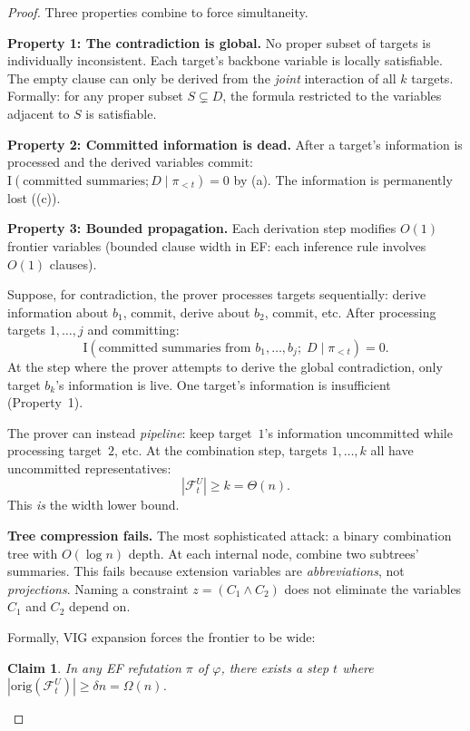 \documentclass[11pt]{article}
\newtheorem{claim}[theorem]{Claim}
\theoremstyle{definition}
\newcommand{\MI}{\mathrm{I}}
\newcommand{\frontier}{\mathcal{F}}
\begin{document}
\begin{proof}
Three properties combine to force simultaneity.

\textbf{Property 1: The contradiction is global.}  No
proper subset of targets is individually inconsistent.  Each target's
backbone variable is locally satisfiable.  The empty clause can only
be derived from the \emph{joint} interaction of all $k$ targets.
Formally: for any proper subset $S \subsetneq D$,
the formula restricted to the variables adjacent to $S$
is satisfiable.

\textbf{Property 2: Committed information is dead.}  After a target's
information is processed and the derived variables commit:
$\MI(\text{committed summaries}; D \mid \pi_{<t}) = 0$ by
(a).  The information is permanently lost
((c)).

\textbf{Property 3: Bounded propagation.}  Each derivation step modifies
$O(1)$ frontier variables (bounded clause width in EF: each inference
rule involves $O(1)$ clauses).

\medskip

Suppose, for contradiction, the prover processes targets sequentially:
derive information about $b_1$, commit, derive about $b_2$, commit,
etc.  After processing targets $1, \ldots, j$ and committing:
\[
\MI(\text{committed summaries from } b_1, \ldots, b_j;\;
D \mid \pi_{<t}) = 0.
\]
At the step where the prover attempts to derive the global
contradiction, only target $b_k$'s information is live.  One target's
information is insufficient (Property~1).

The prover can instead \emph{pipeline}: keep target~$1$'s information
uncommitted while processing target~$2$, etc.  At the combination step,
targets $1, \ldots, k$ all have uncommitted representatives:
\[
|\frontier_t^U| \geq k = \Theta(n).
\]
This \emph{is} the width lower bound.

\textbf{Tree compression fails.}  The most sophisticated attack: a
binary combination tree with $O(\log n)$ depth.  At each internal node,
combine two subtrees' summaries.  This fails because extension variables
are \emph{abbreviations}, not \emph{projections}.  Naming a constraint
$z = (C_1 \wedge C_2)$ does not eliminate the variables $C_1$ and $C_2$
depend on.

Formally, VIG expansion forces the frontier to be wide:

\begin{claim}\label{claim:root-width}
In any EF refutation $\pi$ of $\varphi$, there exists a step $t$
where $|\mathrm{orig}(\frontier_t^U)| \geq \delta n = \Omega(n)$.
\end{claim}


\end{proof}
\end{document}
